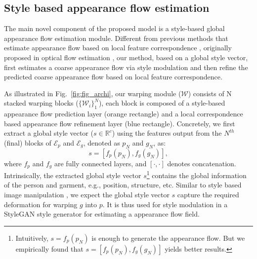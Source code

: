 \documentclass[10pt,twocolumn,letterpaper]{article}
\begin{document}
\subsection{Style based appearance flow estimation}

The main novel component of the proposed model is a  style-based global appearance flow estimation module. Different from previous methods that estimate appearance flow based on local feature correspondence \cite{han2019clothflow, ge2021parser}, originally proposed in optical flow estimation \cite{dosovitskiy2015flownet, ilg2017flownet}, our method, based on a global style vector, first estimates a coarse appearance flow via style modulation and then refine the predicted coarse appearance flow based on local feature correspondence. 

As illustrated in Fig.~\ref{fig:fig_archi}, our warping module ($\mathcal{W}$) consists of N stacked warping blocks ($\{\mathcal{W}_{i}\}_{1}^{N}$), each block is composed of a style-based appearance flow prediction layer (orange rectangle) and a local correspondence based appearance flow refinement layer (blue rectangle). Concretely, we first extract a global style vector ($s \in \mathbb{R}^{c}$) using the features output from the  $N^{th}$ (final) blocks of $\mathcal{E}_{p}$ and $\mathcal{E}_{g}$, denoted as $p_{N}$ and $g_{N}$, as:
\begin{equation}
    s = [f_{p}(p_{N}), f_g(g_{N})],
\end{equation}
where $f_{p}$ and $f_{g}$ are  fully connected layers, and $[\cdot,\cdot]$ denotes concatenation. Intrinsically, the extracted global style vector $s$\footnote{Intuitively, $s = f_{p}(p_{N})$ is enough to generate the appearance flow. But we empirically found that $s = [f_{p}(p_{N}), f_g(g_{N})]$ yields better results.} contains the global information of the person and garment, e.g., position, structure, etc. Similar to style based image manipulation \cite{shen2020interfacegan,shen2021closed, or2020lifespan,he2021disentangled}, we expect the global style vector $s$ capture the required deformation for warping $g$ into $p$. It is thus used for  style modulation in a StyleGAN style generator for estimating a appearance flow field.  
\end{document}
